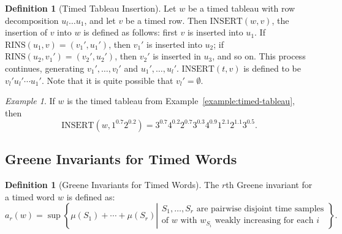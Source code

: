 \documentclass[10pt]{amsproc}
\theoremstyle{definition}
\newtheorem{definition}[theorem]{Definition}
\theoremstyle{remark}
\newtheorem{example}[theorem]{Example}
\newcommand{\rowins}{\mathrm{RINS}}
\newcommand{\ins}{\mathrm{INSERT}}
\begin{document}
\begin{definition}
  [Timed Tableau Insertion]
  Let $w$ be a timed tableau with row decomposition $u_l\dotsc u_1$, and let $v$ be a timed row.
  Then $\ins(w, v)$, the insertion of $v$ into $w$ is defined as follows:
  first $v$ is inserted into $u_1$.
  If $\rowins(u_1,v)=(v_1',u_1')$, then $v_1'$ is inserted into $u_2$; if $\rowins(u_2,v_1')=(v_2',u_2')$, then $v_2'$ is inserted in $u_3$, and so on.
  This process continues, generating $v_1',\dotsc,v_l'$ and $u_1',\dotsc,u_l'$.
  $\ins(t,v)$ is defined to be $v_l'u_l'\dotsb u_1'$.
  Note that it is quite possible that $v_l'=\emptyset$.
\end{definition}
\begin{example}
  If $w$ is the timed tableau from Example~\ref{example:timed-tableau}, then
  \begin{displaymath}
    \ins(w,1^{0.7}2^{0.2})=3^{0.7}4^{0.2}2^{0.7}3^{0.3}4^{0.9}1^{2.1}2^{1.1}3^{0.5}.
  \end{displaymath}
\end{example}
\subsection{Greene Invariants for Timed Words}
\label{sec:greene-invar-timed}
\begin{definition}
  [Greene Invariants for Timed Words]
  The $r$th Greene invariant for a timed word $w$ is defined as:
  \begin{displaymath}
    a_r(w) = \sup\left\{\mu(S_1)+\dotsb + \mu(S_r)\left|
      \begin{array}{cc}
        S_1,\dotsc, S_r \text{ are pairwise disjoint time samples}\\
        \text{of $w$ with $w_{S_i}$ weakly increasing for each $i$}
      \end{array}
      \right.
    \right\}.
  \end{displaymath}
\end{definition}




\end{document}
